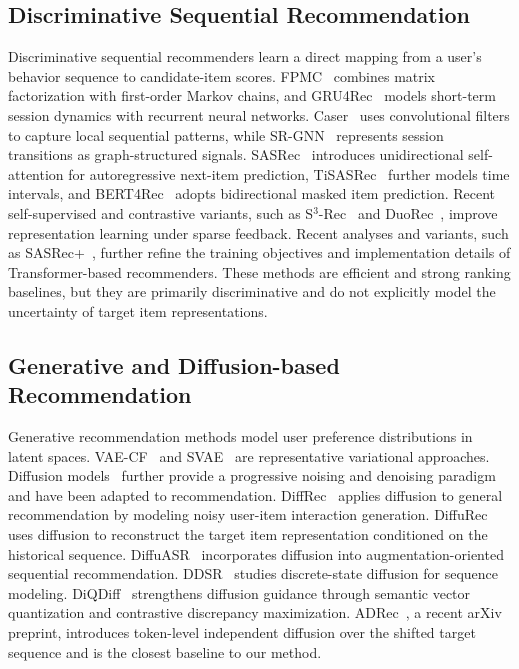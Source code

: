 \documentclass[runningheads,a4paper]{llncs}
\begin{document}
\subsection{Discriminative Sequential Recommendation}
Discriminative sequential recommenders learn a direct mapping from a user's behavior sequence to candidate-item scores. FPMC~\cite{rendle2010fpmc} combines matrix factorization with first-order Markov chains, and GRU4Rec~\cite{hidasi2016gru4rec} models short-term session dynamics with recurrent neural networks. Caser~\cite{tang2018caser} uses convolutional filters to capture local sequential patterns, while SR-GNN~\cite{wu2019srgnn} represents session transitions as graph-structured signals. SASRec~\cite{kang2018sasrec} introduces unidirectional self-attention for autoregressive next-item prediction, TiSASRec~\cite{li2020tisasrec} further models time intervals, and BERT4Rec~\cite{sun2019bert4rec} adopts bidirectional masked item prediction. Recent self-supervised and contrastive variants, such as S$^3$-Rec~\cite{zhou2020s3rec} and DuoRec~\cite{qiu2022duorec}, improve representation learning under sparse feedback. Recent analyses and variants, such as SASRec+~\cite{klenitskiy2023sasrecplus}, further refine the training objectives and implementation details of Transformer-based recommenders. These methods are efficient and strong ranking baselines, but they are primarily discriminative and do not explicitly model the uncertainty of target item representations.

\subsection{Generative and Diffusion-based Recommendation}
Generative recommendation methods model user preference distributions in latent spaces. VAE-CF~\cite{liang2018vae} and SVAE~\cite{sachdeva2019svae} are representative variational approaches. Diffusion models~\cite{ho2020ddpm,song2021score} further provide a progressive noising and denoising paradigm and have been adapted to recommendation. DiffRec~\cite{wang2023diffrec} applies diffusion to general recommendation by modeling noisy user-item interaction generation. DiffuRec~\cite{li2023diffurec} uses diffusion to reconstruct the target item representation conditioned on the historical sequence. DiffuASR~\cite{liu2023diffuasr} incorporates diffusion into augmentation-oriented sequential recommendation. DDSR~\cite{xie2024ddsr} studies discrete-state diffusion for sequence modeling. DiQDiff~\cite{diqdiff2025} strengthens diffusion guidance through semantic vector quantization and contrastive discrepancy maximization. ADRec~\cite{chen2025adrec}, a recent arXiv preprint, introduces token-level independent diffusion over the shifted target sequence and is the closest baseline to our method.
\end{document}
